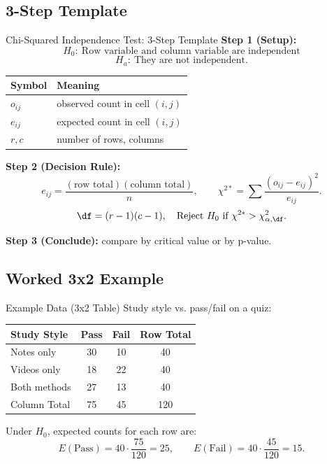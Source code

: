 \documentclass[aspectratio=169]{beamer}
\begin{document}
\subsection{3-Step Template}
\begin{frame}{Chi-Squared Independence Test: 3-Step Template}
  \small
  \textbf{Step 1 (Setup):}
  \[
    H_0:\ \text{Row variable and column variable are independent}
  \]
  \[
    H_a:\ \text{They are not independent}.
  \]

  \vspace{1mm}
  \centering
  \begin{tabular}{ll}
    \hline
    Symbol & Meaning \\
    \hline
    \(o_{ij}\) & observed count in cell \((i,j)\) \\
    \(e_{ij}\) & expected count in cell \((i,j)\) \\
    \(r,c\) & number of rows, columns \\
    \hline
  \end{tabular}

  \raggedright
  \vspace{1mm}
  \textbf{Step 2 (Decision Rule):}
  \[
    e_{ij}=\frac{(\text{row total})(\text{column total})}{n},
    \qquad
    \chi^{2*}=\sum\frac{(o_{ij}-e_{ij})^2}{e_{ij}}.
  \]
  \[
    \df=(r-1)(c-1),
    \quad
    \text{Reject }H_0\text{ if }\chi^{2*}>\chi^2_{\alpha,\df}.
  \]

  \textbf{Step 3 (Conclude):} compare by critical value or by p-value.
\end{frame}

\subsection{Worked 3x2 Example}
\begin{frame}{Example Data (3x2 Table)}
  Study style vs. pass/fail on a quiz:

  \vspace{1mm}
  \centering
  \begin{tabular}{lccc}
    \hline
    Study Style & Pass & Fail & Row Total \\
    \hline
    Notes only & 30 & 10 & 40 \\
    Videos only & 18 & 22 & 40 \\
    Both methods & 27 & 13 & 40 \\
    \hline
    Column Total & 75 & 45 & 120 \\
    \hline
  \end{tabular}

  \vspace{2mm}
  Under \(H_0\), expected counts for each row are:
  \[
    E(\text{Pass})=40\cdot\frac{75}{120}=25,
    \qquad
    E(\text{Fail})=40\cdot\frac{45}{120}=15.
  \]
\end{frame}
\end{document}
